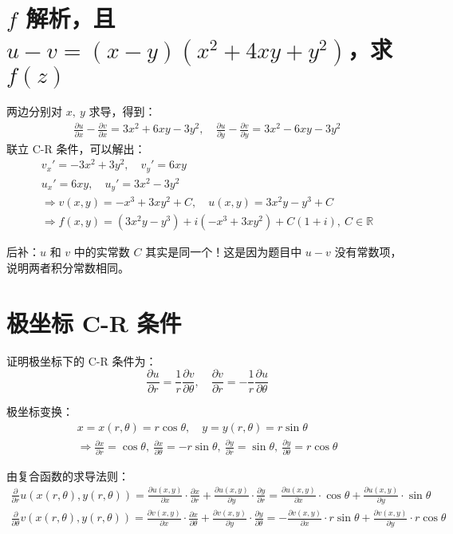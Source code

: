 \documentclass[UTF8]{report}
\def\R{\mathbb{R}}
\theoremstyle{MyLineTheoremStyle} %
\theoremstyle{MyBlockTheoremStyle} %
\theoremstyle{MySubsubsectionStyle} %
\begin{document}
\section{$f$ 解析，且 $u - v = (x-y)(x^2 + 4xy + y^2)$，求 $f(z)$}
两边分别对 $x,\ y$ 求导，得到：
\begin{gather*}
\frac{\partial u }{\partial x } - \frac{\partial v }{\partial x }  = 3x^2 + 6xy -3y^2, \quad 
\frac{\partial u }{\partial y } - \frac{\partial v }{\partial y } = 3x^2 - 6xy -3y^2
\end{gather*}
联立 C-R 条件，可以解出：
\begin{gather*}
v_x' = -3x^2 + 3y^2, \quad v_y' = 6xy \\ 
u_x' = 6xy,\quad u_y' = 3x^2 - 3y^2 \\ 
\Longrightarrow v(x,y) = -x^3 + 3xy^2 + C, \quad u(x,y) = 3x^2y - y^3 + C \\ 
\Longrightarrow f(x,y) = (3x^2y - y^3) + i(-x^3 + 3xy^2) + C(1+i),\ C \in \R
\end{gather*}

{\par\color{gray}\small
后补：$u$ 和 $v$ 中的实常数 $C$ 其实是同一个！这是因为题目中 $u-v$ 没有常数项，说明两者积分常数相同。
\par}


\section{极坐标 C-R 条件}
证明极坐标下的 C-R 条件为：
\begin{equation*}
\frac{\partial u }{\partial r } = \frac{1}{r}\frac{\partial v }{\partial \theta }, \quad \frac{\partial v }{\partial r } = -\frac{1}{r}\frac{\partial u }{\partial \theta } 
\end{equation*}

极坐标变换：
\begin{gather*}
    x = x(r,\theta ) = r\cos \theta, \quad y = y(r,\theta ) = r\sin \theta  \\ \Longrightarrow 
    \frac{\partial x }{\partial r } = \cos \theta,\ \frac{\partial x }{\partial \theta } = -r\sin \theta,\ \frac{\partial y }{\partial r } = \sin \theta,\ \frac{\partial y }{\partial \theta } = r\cos \theta
\end{gather*}

由复合函数的求导法则：
\begin{gather*}
\frac{\partial  }{\partial r }u\left(x(r, \theta),y(r, \theta)\right) 
= \frac{\partial u(x,y) }{\partial x }\cdot\frac{\partial x}{\partial r } + \frac{\partial u(x,y) }{\partial y}\cdot\frac{\partial y}{\partial r } 
= \frac{\partial u(x,y) }{\partial x }\cdot \cos \theta + \frac{\partial u(x,y) }{\partial y}\cdot \sin \theta 
\\
\frac{\partial  }{\partial \theta }v\left(x(r, \theta),y(r, \theta)\right) 
= \frac{\partial v(x,y) }{\partial x }\cdot\frac{\partial x}{\partial \theta } + \frac{\partial v(x,y) }{\partial y}\cdot\frac{\partial y}{\partial \theta } 
= - \frac{\partial v(x,y) }{\partial x } \cdot r\sin \theta + \frac{\partial v(x,y) }{\partial y}\cdot r \cos \theta 
\end{gather*}
\end{document}
